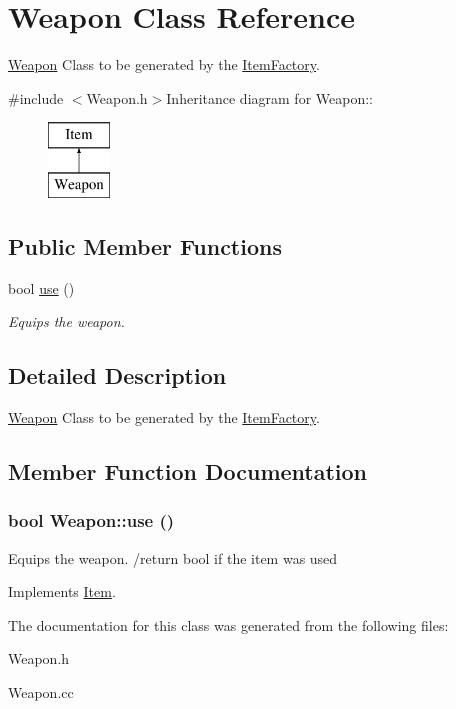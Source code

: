 \hypertarget{classWeapon}{
\section{Weapon Class Reference}
\label{classWeapon}
}


\hyperlink{classWeapon}{Weapon} Class to be generated by the \hyperlink{classItemFactory}{ItemFactory}.  


{\ttfamily \#include $<$Weapon.h$>$}Inheritance diagram for Weapon::\begin{figure}[H]
\begin{center}
\leavevmode
\includegraphics[height=2cm]{classWeapon}
\end{center}
\end{figure}
\subsection*{Public Member Functions}
\begin{DoxyCompactItemize}
\item 
bool \hyperlink{classWeapon_abedafeeba6ba5be4313689f54c7260a5}{use} ()
\begin{DoxyCompactList}\small\item\em Equips the weapon. \item\end{DoxyCompactList}\end{DoxyCompactItemize}


\subsection{Detailed Description}
\hyperlink{classWeapon}{Weapon} Class to be generated by the \hyperlink{classItemFactory}{ItemFactory}. 

\subsection{Member Function Documentation}
\hypertarget{classWeapon_abedafeeba6ba5be4313689f54c7260a5}{
\subsubsection[{use}]{\setlength{\rightskip}{0pt plus 5cm}bool Weapon::use ()}}
\label{classWeapon_abedafeeba6ba5be4313689f54c7260a5}


Equips the weapon. /return bool if the item was used 

Implements \hyperlink{classItem_af71d041445dd5f2f99ac146187c893f1}{Item}.

The documentation for this class was generated from the following files:\begin{DoxyCompactItemize}
\item 
Weapon.h\item 
Weapon.cc\end{DoxyCompactItemize}
